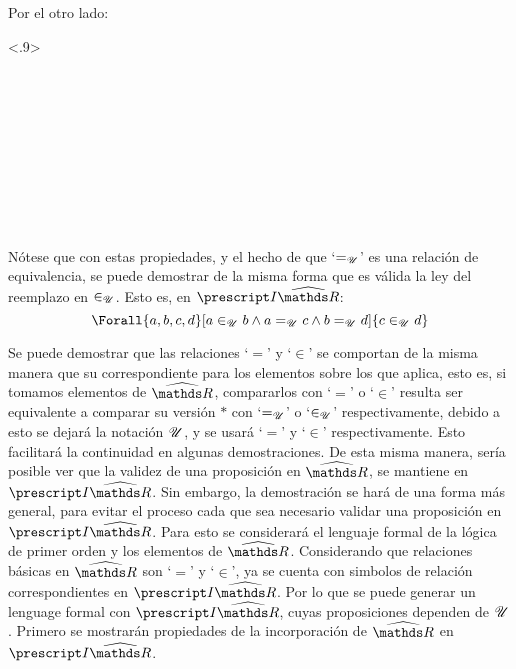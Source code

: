 \begin{demo}
  Por el otro lado:
  \begin{longderivation}<.9>
      \\
    \To\\
      \\
    \equiv\\
      \\
    \equiv\\
      \\
    \equiv\\
      \\
    \equiv\\
  \end{longderivation}
\end{demo}

Nótese que con estas propiedades, y el hecho de que `$=_{\mathscr{U}}$' es una
relación de equivalencia, se puede demostrar de la misma forma que
es válida la ley del reemplazo en $\in_{\mathscr{U}}$. Esto es, en $\IRh$:
\[\Forall{a,b,c,d}[a\inu b \land a\equ c \land b \equ d]{c\inu d}\]

Se puede demostrar que las relaciones `$=$' y `$\in$' se comportan de
la misma manera que su correspondiente para los elementos sobre los que
aplica, esto es, si tomamos elementos de $\Rh$, compararlos con `$=$' o
`$\in$' resulta ser equivalente a comparar su versión $*$ con `$=_{\mathscr{U}}$'
o `$\in_{\mathscr{U}}$' respectivamente, debido a esto se dejará la notación $\mathscr{U}$, y
se usará `$=$' y `$\in$' respectivamente. Esto facilitará la
continuidad en algunas demostraciones. De esta misma manera, sería
posible ver que la validez de una proposición en $\Rh$, se mantiene en
$\IRh$. Sin embargo, la demostración se hará de una forma más general,
para evitar el proceso cada que sea necesario validar una proposición
en $\IRh$. Para esto se considerará el lenguaje formal de la lógica de
primer orden y los elementos de $\Rh$. Considerando que relaciones
básicas en $\Rh$ son `$=$' y `$\in$', ya se cuenta con simbolos de
relación correspondientes en $\IRh$. Por lo que se puede generar un
lenguage formal con $\IRh$, cuyas proposiciones dependen de $\mathscr{U}$.
Primero se mostrarán propiedades de la incorporación de $\Rh$ en $\IRh$.

